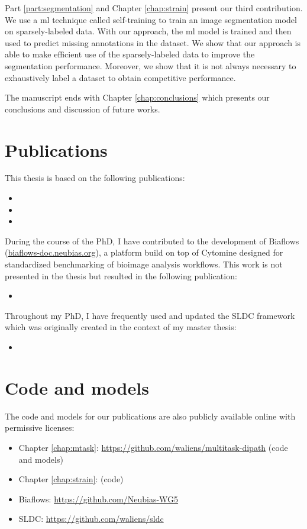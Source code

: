 Part \ref{part:segmentation} and Chapter \ref{chap:strain} present our third contribution. We use a \acrlong{ml} technique called self-training to train an image segmentation model on sparsely-labeled data. With our approach, the \acrlong{ml} model is trained and then used to predict missing annotations in the dataset. We show that our approach is able to make efficient use of the sparsely-labeled data to improve the segmentation performance. Moreover, we show that it is not always necessary to exhaustively label a dataset to obtain competitive performance. 

The manuscript ends with Chapter \ref{chap:conclusions} which presents our conclusions and discussion of future works.

\section{Publications}

This thesis is based on the following publications:
\begin{itemize}
  \item {}
  \item {}
  \item {}
\end{itemize}

During the course of the PhD, I have contributed to the development of Biaflows (\url{biaflows-doc.neubias.org}), a platform build on top of Cytomine designed for standardized benchmarking of bioimage analysis workflows. This work is not presented in the thesis but resulted in the following publication: 
\begin{itemize}
  \item {}
\end{itemize}

Throughout my PhD, I have frequently used and updated the SLDC framework which was originally created in the context of my master thesis:
\begin{itemize}
  \item {}
\end{itemize}

\section{Code and models}

The code and models for our publications are also publicly available online with permissive licenses:
\begin{itemize}
  \item Chapter \ref{chap:mtask}: \url{https://github.com/waliens/multitask-dipath} (code and models)
  \item Chapter \ref{chap:strain}:  (code)
  \item Biaflows: \url{https://github.com/Neubias-WG5}
  \item SLDC: \url{https://github.com/waliens/sldc}
\end{itemize}

